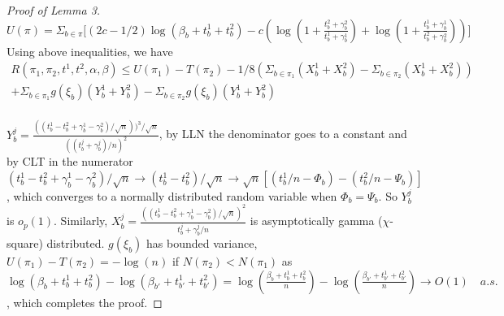 \documentclass[aoas,preprint]{imsart}
\begin{document}
\begin{proof}[Proof of Lemma 3]
$U(\pi) = \Sigma_{b\in\pi}\big[(2c - 1/2) \log(\beta_b + t_b^1 + t_b^2) 
  - c(\log(1 + \frac{t_b^2 + \gamma_b^2}{t_b^1 + \gamma_b^1}) + \log(1 + \frac{t_b^1 + \gamma_b^1}{t_b^2 + \gamma_b^2}))\big]$\\
  
 Using above inequalities, we have 
 \begin{eqnarray*}
  R(\pi_1, \pi_2, t^1, t^2, \alpha, \beta)  \leq U(\pi_1) - T(\pi_2) - 1/8 (\Sigma_{b\in\pi_1}(X_b^1 + X_b^2) - \Sigma_{b\in\pi_2}(X_b^1 + X_b^2)) \\ 
 + \Sigma_{b\in\pi_1}g(\xi_b)(Y_b^1 + Y_b^2)  - \Sigma_{b\in\pi_2}g(\xi_ b)(Y_b^1 + Y_b^2)\\
 \end{eqnarray*}
 
 $Y_b^j =  \frac{((t_b^1 - t_b^2 + \gamma_b^1 - \gamma_b^2) / \sqrt{n}))^3 / \sqrt{n}}{((t_b^j + \gamma_b^j) /n)^2}$, by LLN the denominator goes to a constant and by CLT in the numerator $(t_b^1 - t_b^2 + \gamma_b^1 - \gamma_b^2) / \sqrt{n} \rightarrow (t_b^1 - t_b^2) / \sqrt{n} \rightarrow \sqrt{n}[(t_b^1 / n  - \Phi_b) - (t_b^2 / n - \Psi_b)]$, 
which converges to a normally distributed random variable when $\Phi_b = \Psi_b$. So $Y_b^j$ is $o_p(1)$. Similarly,  $X_b^j =  \frac{((t_b^1 - t_b^2 + \gamma_b^1 - \gamma_b^2) / \sqrt{n})^2}{t_b^j + \gamma_b^j / n}$ is asymptotically gamma ($\chi$-square) distributed.
$g(\xi_b)$ has bounded variance,
 $U(\pi_1) - T(\pi_2) = -\log(n)$ if $N(\pi_2) < N(\pi_1)$
 as $ \log(\beta_b + t_b^1 + t_b^2)  -  \log(\beta_{b'} + t_{b'}^1 + t_{b'}^2) =  \log(\frac{\beta_b + t_b^1 + t_b^2}{n})  -  \log(\frac{\beta_{b'} + t_{b'}^1 + t_{b'}^2}{n}) \rightarrow O(1) \quad a.s.$, which completes the proof.




\end{proof}

\end{document}
